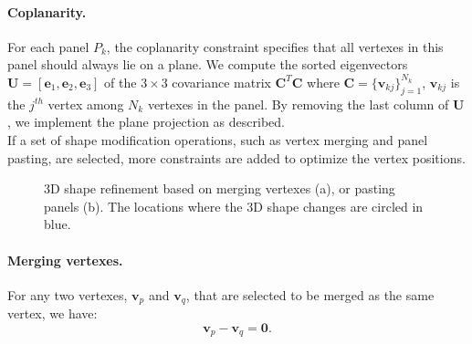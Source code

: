 \paragraph{Coplanarity.} For each panel $P_{k}$, the coplanarity constraint specifies that all vertexes in this panel should always lie on a plane. 
We compute the sorted eigenvectors $\mathbf{U} = [\mathbf{e}_1, \mathbf{e}_2, \mathbf{e}_3]$ of the $ 3 \times 3$ covariance matrix $\mathbf{C}^T\mathbf{C}$ where $\mathbf{C} = \{\mathbf{v}_{kj}\}_{j=1}^{N_k}$, $\mathbf{v}_{kj}$ is the $j^{th}$ vertex among $N_k$ vertexes in the panel. By removing the last column of $\mathbf{U}$, we implement the plane projection as \cite{Bouaziz:2012:SSD:2346796.2346802} described.
\\

If a set of shape modification operations, such as vertex merging and panel pasting, are selected, more constraints are added to optimize the vertex positions. 

\begin{figure}
	\centering
	\hfill
	\caption{3D shape refinement based on merging vertexes (a), or pasting panels (b). The locations where the 3D shape changes are circled in blue.  }
	\label{fig:shaperefinement}
\end{figure}

\paragraph{Merging vertexes.} 
For any two vertexes, $\mathbf{v}_p$ and $\mathbf{v}_q$, that are selected to be merged as the same vertex, we have:
\begin{equation}
\mathbf{v}_p - \mathbf{v}_q = \mathbf{0}.
\label{equ:point}
\end{equation}

